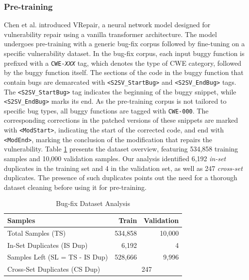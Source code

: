 \subsubsection{Pre-training} \label{Pre-training}
Chen et al.\cite{chen2022neural} introduced VRepair, a neural network model designed for vulnerability repair using a vanilla transformer architecture.
The model undergoes pre-training with a generic bug-fix corpus followed by fine-tuning on a specific vulnerability dataset.
In the bug-fix corpus, each input buggy function is prefixed with a \texttt{CWE-\emph{XXX}} tag, which denotes the type of CWE category, followed by the buggy function itself.
The sections of the code in the buggy function that contain bugs are demarcated with \texttt{<S2SV\_StartBug>} and \texttt{<S2SV\_EndBug>} tags.
The \texttt{<S2SV\_StartBug>} tag indicates the beginning of the buggy snippet, while \texttt{<S2SV\_EndBug>} marks its end.
As the pre-training corpus is not tailored to specific bug types, all buggy functions are tagged with \texttt{CWE-000}.
The corresponding corrections in the patched versions of these snippets are marked with \texttt{<ModStart>}, indicating the start of the corrected code, and end with \texttt{<ModEnd>}, marking the conclusion of the modification that repairs the vulnerability.
Table \ref{Methodology:bug-fix-dataset} presents the dataset overview, featuring 534,858 training samples and 10,000 validation samples.
Our analysis identified 6,192 \emph{in-set} duplicates in the training set and 4 in the validation set, as well as 247 \emph{cross-set} duplicates.
The presence of such duplicates points out the need for a thorough dataset cleaning before using it for pre-training.
\begin{table}[h]
\centering
  \caption{Bug-fix Dataset Analysis}
  \label{Methodology:bug-fix-dataset}
  \begin{tabular}{|l|r|r|}
    \hline
    Samples &Train &Validation\\
    \hline
    Total Samples (TS)                                  &534,858  &10,000\\
    \hline
    In-Set Duplicates (IS Dup)                          &6,192  &4\\
    \hline
    Samples Left (SL = TS - IS Dup)                     &528,666  &9,996\\
    \hline
    {Cross-Set Duplicates (CS Dup)}  &\multicolumn{2}{c|}{247}\\
  \hline
\end{tabular}
\end{table}


